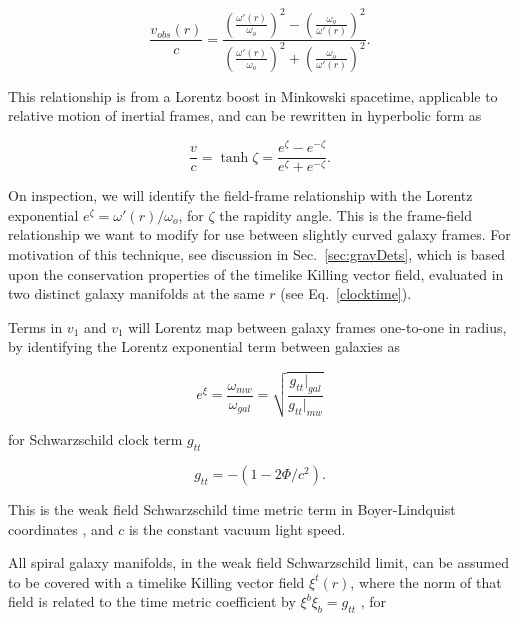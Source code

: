 \documentclass[reprint,%
 amsmath,amssymb,
 aps,
]{revtex4-1}
\begin{document}
 \begin{equation}
 \frac{v_{obs}(r) }{c}=
\frac{  \left( \frac{\omega'(r)}{\omega_o}\right)^2 -  \left( \frac{\omega_o}{\omega'(r)} \right)^2 }{  \left( \frac{\omega'(r)}{\omega_o}\right)^2  +  \left( \frac{\omega_o}{\omega'(r)}\right)^2 }. 
\label{eq:modelLumA}
\end{equation} 

 This   relationship is from a Lorentz  boost in Minkowski spacetime,   applicable to 
  relative   motion of inertial frames, and can be rewritten in hyperbolic form\cite{rindler2013essential} as


     \begin{equation}
         \frac{v}{c} = \tanh \zeta = \frac{e^\zeta - e^{-\zeta}}{e^\zeta + e^{-\zeta}} .   
         \label{boost}
     \end{equation} 

On inspection, we will identify   the field-frame relationship with the   Lorentz exponential    $e^\zeta = \omega'(r) /\omega_o$, for
$\zeta$ the   rapidity  angle.  This is    the  frame-field relationship we want to modify for use between slightly curved galaxy frames. 
For  motivation of this    technique,  see discussion   in  Sec.~\ref{sec:gravDets}, which   is  based upon the conservation properties of the timelike Killing vector field,  evaluated  in   two distinct galaxy manifolds at the same $r$ (see Eq.~\ref{clocktime}).  


 Terms in $v_1$ and   $v_1$ will Lorentz map between galaxy frames one-to-one in radius, by identifying the Lorentz exponential term   between  galaxies  as
   
     \begin{equation}
     e^{\xi}=  \frac{\omega_{mw}}{\omega_{gal}}  =\sqrt{\frac{g_{tt}|_{gal}}{g_{tt}|_{mw}}}
      \label{eq:gravRS}
    \end{equation}
    
for  
 Schwarzschild   clock term $g_{tt}$
 
  \begin{equation}
      g_{tt}= -( 1 - 2\Phi/ c^2).
      \label{clocktime}
  \end{equation} 
  
 This is the    weak field Schwarzschild   time metric term in  Boyer-Lindquist coordinates \cite{Hartle}, and $c$ is the constant vacuum light speed.
  
  
 All spiral galaxy manifolds,  in the weak field Schwarzschild limit, can be     assumed to be covered with a timelike   Killing vector field 
   $\xi^t(r)$, where the norm of that field is related to the time metric coefficient  by  $\xi^b \xi_b =g_{tt}$ \cite{Wald}, for 
   
\end{document}
